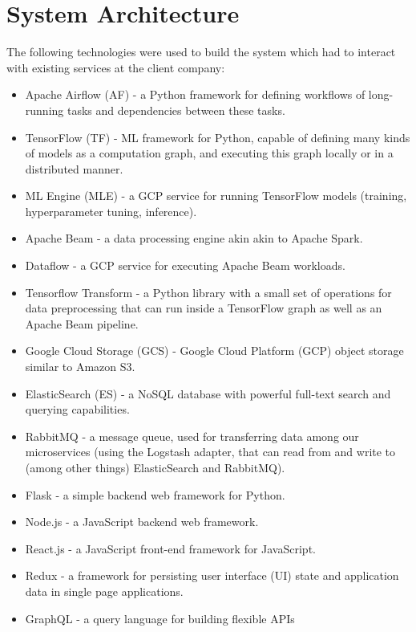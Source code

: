 \section{System Architecture}
\label{architecture}

 The following technologies were used to build the system which had to interact with existing services  at the client company:

\begin{itemize}
  \item Apache Airflow (AF) - a Python framework for defining workflows of long-running tasks and dependencies between these tasks.
  \item TensorFlow (TF) - ML framework for Python, capable of defining many kinds of models as a computation graph, and executing this graph locally or in a distributed manner.
  \item ML Engine (MLE) - a GCP service for running TensorFlow models (training, hyperparameter tuning, inference).
  \item Apache Beam - a data processing engine akin akin to Apache Spark.
  \item Dataflow - a GCP service for executing Apache Beam workloads.
  \item Tensorflow Transform - a Python library with a small set of operations for data preprocessing that can run inside a TensorFlow graph as well as an Apache Beam pipeline.
  \item Google Cloud Storage (GCS) - Google Cloud Platform (GCP) object storage similar to Amazon S3.
  \item ElasticSearch (ES) - a NoSQL database with powerful full-text search and querying capabilities.
  \item RabbitMQ - a message queue, used for transferring data among our microservices (using the Logstash adapter, that can read from and write to (among other things) ElasticSearch and RabbitMQ).
  \item Flask - a simple backend web framework for Python.
  \item Node.js - a JavaScript backend web framework.
  \item React.js - a JavaScript front-end framework for JavaScript.
  \item Redux - a framework for persisting user interface (UI) state and application data in single page applications.
  \item GraphQL - a query language for building flexible APIs
\end{itemize}

